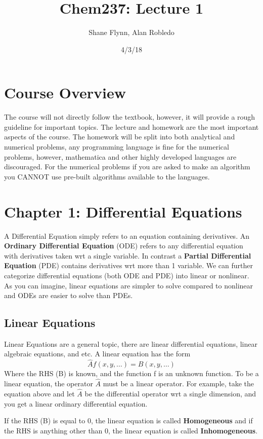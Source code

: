 \documentclass{article}
\title{Chem237: Lecture 1}
\date{4/3/18}
\author{Shane Flynn, Alan Robledo}
\newcommand{\be}{\begin{equation}}
\newcommand{\ee}{\end{equation}}
\begin{document}
\maketitle
\section*{Course Overview}
The course will not directly follow the textbook, however, it will provide a rough guideline for important topics.
The lecture and homework are the most important aspects of the course.
The homework will be split into both analytical and numerical problems, any programming language is fine for the numerical problems, however, mathematica and other highly developed languages are discouraged.
For the numerical problems if you are asked to make an algorithm you CANNOT use pre-built algorithms available to the languages.

\section*{Chapter 1: Differential Equations}
A Differential Equation simply refers to an equation containing derivatives.
An \textbf{Ordinary Differential Equation} (ODE) refers to any differential equation with derivatives taken wrt a single variable.
In contrast a \textbf{Partial Differential Equation} (PDE) contains derivatives wrt more than 1 variable.
We can further categorize differential equations (both ODE and PDE) into linear or nonlinear.
As you can imagine, linear equations are simpler to solve compared to nonlinear and ODEs are easier to solve than PDEs.

\subsection*{Linear Equations}
Linear Equations are a general topic, there are linear differential equations, linear algebraic equations, and etc.
A linear equation has the form
\be
\hat{A} f(x,y,\hdots) = B(x,y,\hdots)
\ee
Where the RHS (B) is known, and the function f is an unknown function.
To be a linear equation, the operator $\hat{A}$ must be a linear operator.
For example, take the equation above and let $\hat{A}$ be the differential operator wrt a single dimension, and you get a linear ordinary differential equation.

If the RHS (B) is equal to 0, the linear equation is called \textbf{Homogeneous} and if the RHS is anything other than 0, the linear equation is called \textbf{Inhomogeneous}.
\end{document}
